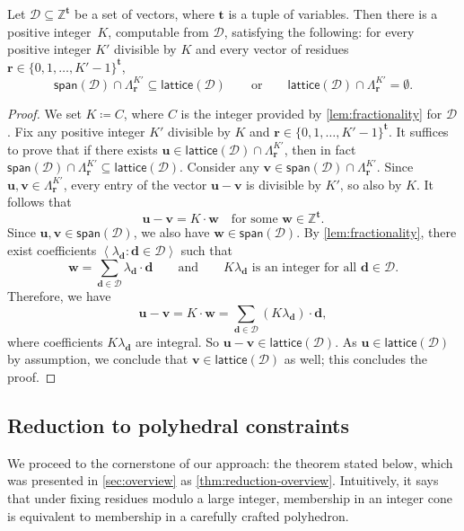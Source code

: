\documentclass{theoretics}
\newcommand{\Dd}{\mathcal{D}}
\newcommand{\Z}{\mathbb{Z}}
\newcommand{\tup}[1]{{\mathbf{#1}}}
\newcommand{\ww}{\tup w}
\newcommand{\tv}{\tup t}
\newcommand{\rr}{\tup r}
\newcommand{\dd}{\tup d}
\newcommand{\uu}{\tup u}
\newcommand{\myvv}{\tup v} %
\newcommand{\mset}[1]{\left\langle #1\right\rangle}
\newcommand{\lattice}{\mathsf{lattice}}
\newcommand{\spn}{\mathsf{span}}
\begin{document}
\begin{lemma}\label{lem:spaceCramer}
 Let $\Dd\subseteq \Z^\tv$ be a set of vectors, where $\tv$ is a tuple of variables. Then there is a positive integer~$K$, computable from $\Dd$, satisfying the following: for every positive integer $K'$ divisible by $K$ and every vector of residues $\rr\in \{0,1,\ldots,K'-1\}^\tv$,
 $$\spn(\Dd)\cap \Lambda^{K'}_\rr \subseteq \lattice(\Dd)\qquad\textrm{or}\qquad \lattice(\Dd)\cap \Lambda^{K'}_\rr=\emptyset.$$
\end{lemma}
\begin{proof}
 We set $K\coloneqq C$, where $C$ is the integer provided by \cref{lem:fractionality} for $\Dd$. Fix any positive integer $K'$ divisible by $K$ and $\rr\in \{0,1,\ldots,K'-1\}^\tv$.
 It suffices to prove that if there exists $\uu\in \lattice(\Dd)\cap \Lambda^{K'}_\rr$, then in fact $\spn(\Dd)\cap \Lambda^{K'}_\rr \subseteq \lattice(\Dd)$. Consider any $\myvv\in \spn(\Dd)\cap \Lambda^{K'}_\rr$. Since $\uu,\myvv\in \Lambda^{K'}_\rr$, every entry of the vector $\uu-\myvv$ is divisible by $K'$, so also by $K$. It follows that
 $$\uu-\myvv = K\cdot \ww\quad \textrm{for some }\ww\in \Z^{\tv}.$$
 Since $\uu,\myvv\in \spn(\Dd)$, we also have $\ww\in \spn(\Dd)$. By \cref{lem:fractionality}, there exist coefficients $\mset{\lambda_\dd\colon \dd\in \Dd}$ such that
 $$\ww=\sum_{\dd\in \Dd} \lambda_\dd\cdot \dd\qquad \textrm{and}\qquad K\lambda_\dd\textrm{ is an integer for all }\dd\in \Dd.$$
 Therefore, we have
 $$\uu-\myvv = K\cdot \ww = \sum_{\dd\in \Dd} (K\lambda_\dd)\cdot \dd,$$
 where coefficients $K\lambda_\dd$ are integral. So $\uu-\myvv\in \lattice(\Dd)$. As $\uu\in \lattice(\Dd)$ by assumption, we conclude that $\myvv\in \lattice(\Dd)$ as well; this concludes the proof.
\end{proof}

\subsection{Reduction to polyhedral constraints}

We proceed to the cornerstone of our approach: the theorem stated below, which was presented in \cref{sec:overview} as \cref{thm:reduction-overview}. Intuitively, it says that under fixing residues modulo a large integer, membership in an integer cone is equivalent to membership in a carefully crafted polyhedron.
\end{document}
